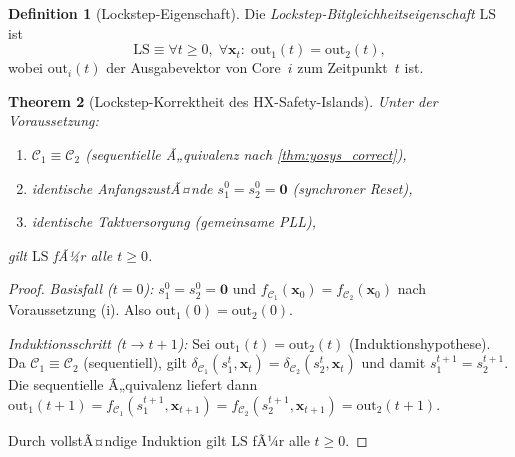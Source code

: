 ﻿\documentclass[a4paper,12pt]{article}
\theoremstyle{plain}
\newtheorem{theorem}{Theorem}[section]
\theoremstyle{definition}
\newtheorem{definition}[theorem]{Definition}
\theoremstyle{remark}
\begin{document}
\begin{definition}[Lockstep-Eigenschaft]\label{def:lockstep}
Die \emph{Lockstep-Bitgleichheitseigenschaft} $\mathrm{LS}$ ist
\[
  \mathrm{LS} \equiv \forall t \geq 0,\; \forall \mathbf{x}_t:\;
  \text{out}_1(t) = \text{out}_2(t),
\]
wobei $\text{out}_i(t)$ der Ausgabevektor von Core~$i$ zum Zeitpunkt~$t$ ist.
\end{definition}

\begin{theorem}[Lockstep-Korrektheit des HX-Safety-Islands]
\label{thm:lockstep}
Unter der Voraussetzung:
\begin{enumerate}[label=(\roman*)]
  \item $\mathcal{C}_1 \equiv \mathcal{C}_2$
        (sequentielle Ã„quivalenz nach \cref{thm:yosys_correct}),
  \item identische AnfangszustÃ¤nde $s_1^0 = s_2^0 = \mathbf{0}$
        (synchroner Reset),
  \item identische Taktversorgung (gemeinsame PLL),
\end{enumerate}
gilt $\mathrm{LS}$ fÃ¼r alle $t \geq 0$.
\end{theorem}
\begin{proof}
\textit{Basisfall ($t=0$):}
$s_1^0 = s_2^0 = \mathbf{0}$ und $f_{\mathcal{C}_1}(\mathbf{x}_0) = f_{\mathcal{C}_2}(\mathbf{x}_0)$
nach Voraussetzung (i). Also $\text{out}_1(0) = \text{out}_2(0)$.

\textit{Induktionsschritt ($t \to t+1$):}
Sei $\text{out}_1(t) = \text{out}_2(t)$ (Induktionshypothese).
Da $\mathcal{C}_1 \equiv \mathcal{C}_2$ (sequentiell), gilt
$\delta_{\mathcal{C}_1}(s_1^t, \mathbf{x}_t) = \delta_{\mathcal{C}_2}(s_2^t, \mathbf{x}_t)$
und damit $s_1^{t+1} = s_2^{t+1}$.
Die sequentielle Ã„quivalenz liefert dann
$\text{out}_1(t+1) = f_{\mathcal{C}_1}(s_1^{t+1}, \mathbf{x}_{t+1})
= f_{\mathcal{C}_2}(s_2^{t+1}, \mathbf{x}_{t+1}) = \text{out}_2(t+1)$.

Durch vollstÃ¤ndige Induktion gilt $\mathrm{LS}$ fÃ¼r alle $t \geq 0$.
\end{proof}
\end{document}
